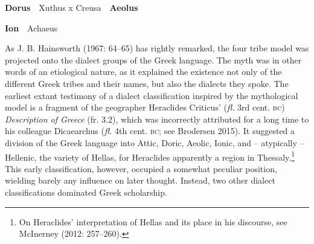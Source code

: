 \begin{styleListParagraph}
\end{styleListParagraph}

\begin{styleStandard}
\textbf{Dorus}\ \ Xuthus x Creusa\ \ \textbf{Aeolus}
\end{styleStandard}

\begin{styleStandard}
\textbf{Ion}\ \ Achaeus
\end{styleStandard}

\begin{styleStandard}
As J. B. Hainsworth (1967: 64–65) has rightly remarked, the four tribe model was projected onto the dialect groups of the Greek language. The myth was in other words of an etiological nature, as it explained the existence not only of the different Greek tribes and their names, but also the dialects they spoke. The earliest extant testimony of a dialect classification inspired by the mythological model is a fragment of the geographer Heraclides Criticus’ (\textit{fl.} 3rd cent. \textsc{bc}) \textit{Description of Greece} (fr. 3.2), which was incorrectly attributed for a long time to his colleague Dicaearchus (\textit{fl.} 4th cent. \textsc{bc};\textsc{ }see Brodersen 2015). It suggested a division of the Greek language into Attic, Doric, Aeolic, Ionic, and – atypically – Hellenic, the variety of Hellas, for Heraclides apparently a region in Thessaly.\footnote{ On Heraclides’ interpretation of Hellas and its place in his discourse, see McInerney (2012: 257–260).} This early classification, however, occupied a somewhat peculiar position, wielding barely any influence on later thought. Instead, two other dialect classifications dominated Greek scholarship.
\end{styleStandard}

